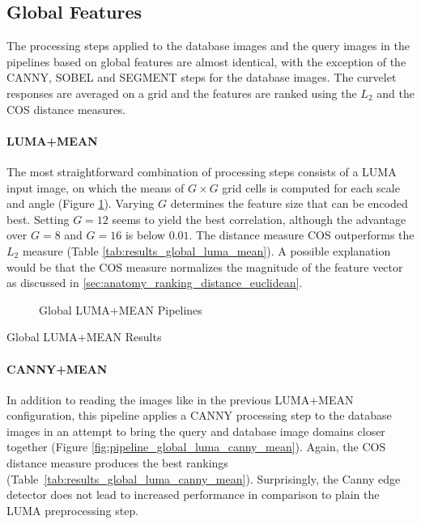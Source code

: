 \subsection{Global Features}

The processing steps applied to the database images and the query images in the
pipelines based on global features are almost identical, with the exception of
the CANNY, SOBEL and SEGMENT steps for the database images. The curvelet
responses are averaged on a grid and the features are ranked using the $L_2$
and the COS distance measures.

\paragraph{LUMA+MEAN}

The most straightforward combination of processing steps consists of a LUMA
input image, on which the means of $G \times G$ grid cells is computed for each
scale and angle (Figure \ref{fig:pipeline_global_luma_mean}).  Varying $G$
determines the feature size that can be encoded best. Setting $G=12$ seems to
yield the best correlation, although the advantage over $G=8$ and $G=16$ is
below $0.01$. The distance measure COS outperforms the $L_2$ measure (Table
\ref{tab:results_global_luma_mean}). A possible explanation would be that the
COS measure normalizes the magnitude of the feature vector as discussed in
\ref{sec:anatomy_ranking_distance_euclidean}.

\begin{figure}[h]
    \centering
    
    \caption[Global LUMA+MEAN Pipelines]{
        Global LUMA+MEAN Pipelines
    }
    \label{fig:pipeline_global_luma_mean}
\end{figure}

\begin{table}[h]
    \centering
    
    \caption[Global LUMA+MEAN Results]{
        Global LUMA+MEAN Results
    }
    \label{tab:results_global_luma_mean}
\end{table}

\FloatBarrier
\paragraph{CANNY+MEAN}

In addition to reading the images like in the previous LUMA+MEAN configuration,
this pipeline applies a CANNY processing step to the database images in an
attempt to bring the query and database image domains closer together (Figure
\ref{fig:pipeline_global_luma_canny_mean}). Again, the COS distance measure
produces the best rankings (Table~\ref{tab:results_global_luma_canny_mean}).
Surprisingly, the Canny edge detector does not lead to increased performance in
comparison to plain the LUMA preprocessing step.

